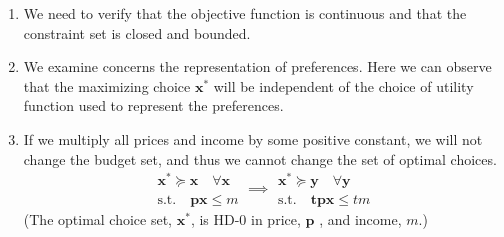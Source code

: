 \begin{enumerate}
    \item We need to verify that the objective function is continuous and that the constraint set is closed and bounded.
    \item We examine concerns the representation of preferences.  
    Here we can observe that the maximizing choice $\mathbf{x}^*$ will be independent of the choice of utility function used to represent the preferences.
    \item If we multiply all prices and income by some positive constant, we will not change the budget set, and thus we cannot change the set of optimal choices. 
    \[
        \begin{array}{l}    
            \mathbf{x}^* \succeq \mathbf{x} \quad \forall \mathbf{x} \\
            \text{s.t.} \quad \mathbf{px} \leq m
        \end{array}
        \implies 
        \begin{array}{l}    
            \mathbf{x}^* \succeq \mathbf{y} \quad \forall \mathbf{y} \\
            \text{s.t.} \quad \mathbf{tpx} \leq tm
        \end{array}
    \]
    (The optimal choice set, $\mathbf{x}^*$, is HD-0 in price, $\mathbf{p}$ , and income, $m$.)
\end{enumerate}

